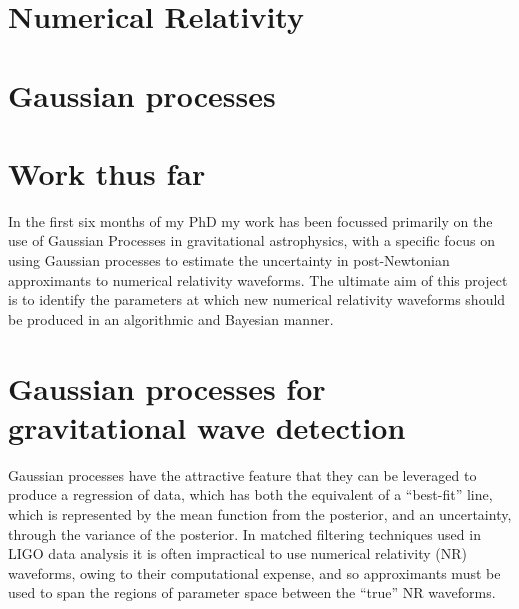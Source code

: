 \documentclass{kentigern}
\begin{document}
\section{Numerical Relativity}
\label{sec:numerical-relativity}



\section{Gaussian processes}
\label{sec:gaussian-process}




\hline

\section{Work thus far}

In the first six months of my PhD my work has been focussed primarily
on the use of Gaussian Processes in gravitational astrophysics, with a
specific focus on using Gaussian processes to estimate the uncertainty
in post-Newtonian approximants to numerical relativity waveforms. The
ultimate aim of this project is to identify the parameters at which
new numerical relativity waveforms should be produced in an
algorithmic and Bayesian manner.

\section{Gaussian processes for gravitational wave detection}
\label{sec:gauss-proc-grav}

Gaussian processes have the attractive feature that they can be
leveraged to produce a regression of data, which has both the
equivalent of a ``best-fit'' line, which is represented by the mean
function from the posterior, and an uncertainty, through the variance
of the posterior. In matched filtering techniques used in LIGO data
analysis it is often impractical to use numerical relativity (NR)
waveforms, owing to their computational expense, and so approximants
must be used to span the regions of parameter space between the
``true'' NR waveforms.
\end{document}
